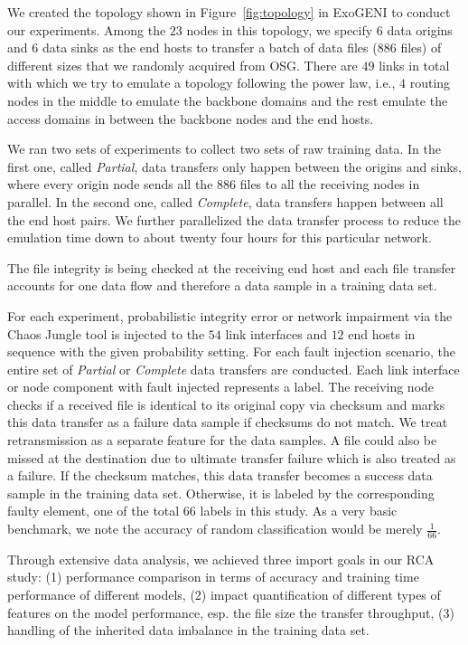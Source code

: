 We created the topology shown in Figure~\ref{fig:topology} in ExoGENI to conduct our experiments. Among the $23$ nodes in this topology, we specify $6$ data origins and $6$ data sinks as the end hosts 
to transfer a batch of data files ($886$ files) of different sizes that we randomly acquired from OSG. There are $49$ links in total with which we try to emulate a topology following the power law, i.e., $4$ routing 
nodes in the middle to emulate the backbone domains and the rest emulate the access domains in between the backbone nodes and the end hosts. 

We ran two sets of experiments to collect two sets of raw training data. In the first one, called {\it Partial},
data transfers only happen between the origins and sinks, where every origin node sends all the $886$ files 
to all the receiving nodes in parallel. In the second one, called {\it Complete}, data transfers happen between all the end host pairs. 
We further parallelized the data transfer process to reduce the emulation time down to about twenty four hours for this particular network.  

The file integrity is being checked at the receiving end host and each file transfer accounts for one data flow and therefore a
 data sample in a training data set.

For each experiment, probabilistic integrity error or network impairment via the Chaos Jungle tool is injected to the $54$ link interfaces and $12$ end hosts in sequence with the given probability setting. 
For each fault injection scenario, the entire set of {\it Partial} or {\it Complete} data transfers are conducted. Each link interface or node component with fault injected represents a label.  
The receiving node checks if a received file is identical to its original copy via checksum and marks this data transfer as a failure data sample if checksums do not match. 
We treat retransmission as a separate feature for the data samples.  A file could also be missed at the destination due to ultimate transfer failure which is also treated as a failure. 
If the checksum matches, this data transfer becomes a success data sample in the training data set. Otherwise, it is labeled by the corresponding faulty element, one of the total $66$ labels in this study. 
As a very basic benchmark, we note the accuracy of random classification would be merely $\frac{1}{66}$.

Through extensive data analysis, we achieved three import goals in our RCA study:  (1) performance comparison in terms of accuracy and training time performance of different models, 
(2) impact quantification of different types of features on the model performance, esp. the file size the transfer throughput, (3) handling of the inherited data imbalance in the training data set.

